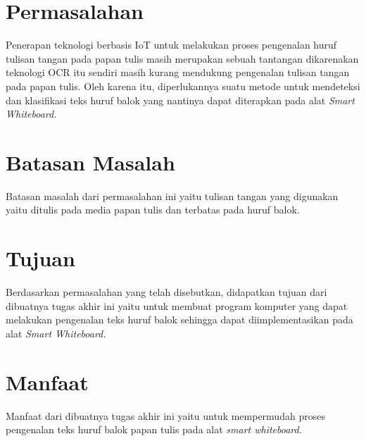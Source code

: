 \section{Permasalahan}
\label{sec:permasalahan}
Penerapan teknologi berbasis IoT untuk melakukan proses pengenalan huruf tulisan tangan pada papan tulis masih merupakan sebuah tantangan dikarenakan teknologi OCR itu sendiri masih kurang mendukung pengenalan tulisan tangan pada papan tulis. Oleh karena itu, diperlukannya suatu metode untuk mendeteksi dan klasifikasi teks huruf balok yang nantinya dapat diterapkan pada alat \textit{Smart Whiteboard.}


\section{Batasan Masalah}
\label{sec:batasanmasalah}

Batasan masalah dari permasalahan ini yaitu tulisan tangan yang digunakan yaitu ditulis pada media papan tulis dan terbatas pada huruf balok.

\section{Tujuan}
\label{sec:Tujuan}

Berdasarkan permasalahan yang telah disebutkan, didapatkan tujuan dari dibuatnya tugas akhir ini yaitu untuk membuat program komputer yang dapat melakukan pengenalan teks huruf balok sehingga dapat diimplementasikan pada alat \textit{Smart Whiteboard.}

\section{Manfaat}
\label{sec:manfaat}

Manfaat dari dibuatnya tugas akhir ini yaitu untuk mempermudah proses pengenalan teks huruf balok papan tulis pada alat \textit{smart whiteboard.}



